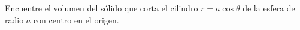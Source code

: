 \item Encuentre el volumen del sólido que corta el cilindro $r = a \cos \theta$ de la esfera de radio $a$ con centro en el origen.
